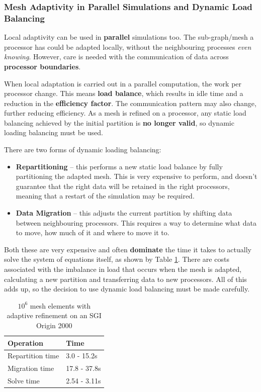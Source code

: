 \documentclass{article}
\begin{document}
\subsubsection{Mesh Adaptivity in Parallel Simulations and Dynamic Load Balancing}

Local adaptivity can be used in \textbf{parallel} simulations too. The sub-graph/mesh a processor has could be adapted locally, without the neighbouring processes \textit{even knowing}. However, care is needed with the communication of data across \textbf{processor boundaries}.

When local adaptation is carried out in a parallel computation, the work per processor change. This means \textbf{load balance}, which results in idle time and a reduction in the \textbf{efficiency factor}. The communication pattern may also change, further reducing efficiency. As a mesh is refined on a processor, any static load balancing achieved by the initial partition is \textbf{no longer valid}, so dynamic loading balancing must be used.

There are two forms of dynamic loading balancing:
\begin{itemize}
	\item \textbf{Repartitioning} -- this performs a new static load balance by fully partitioning the adapted mesh. This is very expensive to perform, and doesn't guarantee that the right data will be retained in the right processors, meaning that a restart of the simulation may be required.
	\item \textbf{Data Migration} -- this adjusts the current partition by shifting data between neighbouring processors. This requires a way to determine what data to move, how much of it and where to move it to.
\end{itemize}

Both these are very expensive and often \textbf{dominate} the time it takes to actually solve the system of equations itself, as shown by Table \ref{tab:dynamic-load-balancing-costs}. There are costs associated with the imbalance in load that occurs when the mesh is adapted, calculating a new partition and transferring data to new processors. All of this adds up, so the decision to use dynamic load balancing must be made carefully.

\begin{table}
	\centering
	\begin{tabular}{|l|l|}
		\hline
		\textbf{Operation} & \textbf{Time} \\
		\hline
		Repartition time & 3.0 - 15.2s \\
		Migration time & 17.8 - 37.8s \\
		Solve time & 2.54 - 3.11s \\
		\hline
	\end{tabular}
	\caption{$10^6$ mesh elements with adaptive refinement on an SGI Origin 2000}
	\label{tab:dynamic-load-balancing-costs}
\end{table}
\end{document}
